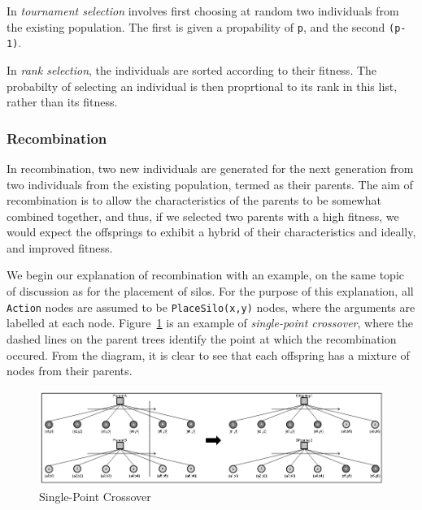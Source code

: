        In \emph{tournament selection} involves first choosing at random two individuals from the existing population. The first is given a propability of \texttt{p}, and the second \texttt{(p-1)}.
        
        In \emph{rank selection}, the individuals are sorted according to their fitness. The probabilty of selecting an individual is then proprtional to its rank in this list, rather than its fitness.
       
        \subsubsection{Recombination}
        
        In recombination, two new individuals are generated for the next generation from two individuals from the existing population, termed as their parents. The aim of recombination is to allow the characteristics of the parents to be somewhat combined together, and thus, if we selected two parents with a high fitness, we would expect the offsprings to exhibit a hybrid of their characteristics and ideally, and improved fitness.
        
        We begin our explanation of recombination with an example, on the same topic of discussion as for the placement of silos. For the purpose of this explanation, all \texttt{Action} nodes are assumed to be \texttt{PlaceSilo(x,y)} nodes, where the arguments are labelled at each node.  Figure~\ref{img:recombination-a} is an example of \emph{single-point crossover}, where the dashed lines on the parent trees identify the point at which the recombination occured. From the diagram, it is clear to see that each offspring has a mixture of nodes from their parents. 
        
        \begin{figure}[htp]
            \begin{center}
            \includegraphics[scale=0.4]{images/recombination-a.png}
            \caption{Single-Point Crossover}
            \label{img:recombination-a}
            \end{center} 
        \end{figure}
        

